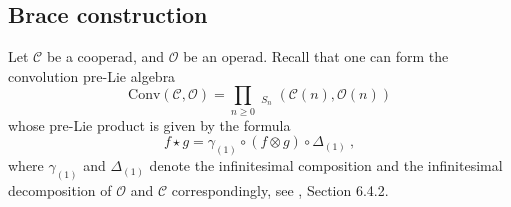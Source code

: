 \documentclass[10pt, oneside]{amsart}
\theoremstyle{plain}
\newcommand{\C}{\mathcal{C}}
\newcommand{\conv}{\mathrm{Conv}}
\renewcommand{\O}{\mathcal{O}}
\DeclareMathOperator{\uhom}{\underline{Hom}}
\begin{document}
\subsection{Brace construction}\label{basics-brace}

Let $\C$ be a cooperad, and $\O$ be an operad. Recall that one can form the convolution pre-Lie algebra
\begin{equation}\label{basics-conv-alg}
\conv(\C, \O) = \prod_{n \ge 0} \uhom_{S_n} (\C(n), \O(n))
\end{equation}
whose pre-Lie product is given by the formula
\begin{equation*}
f \star g = \gamma_{(1)} \circ (f \otimes g) \circ \Delta_{(1)} \:,
\end{equation*}
where $\gamma_{(1)}$ and $\Delta_{(1)}$ denote the infinitesimal composition and the infinitesimal decomposition of $\O$ and $\C$ 
correspondingly, see \cite{LV}, Section 6.4.2.
\end{document}
